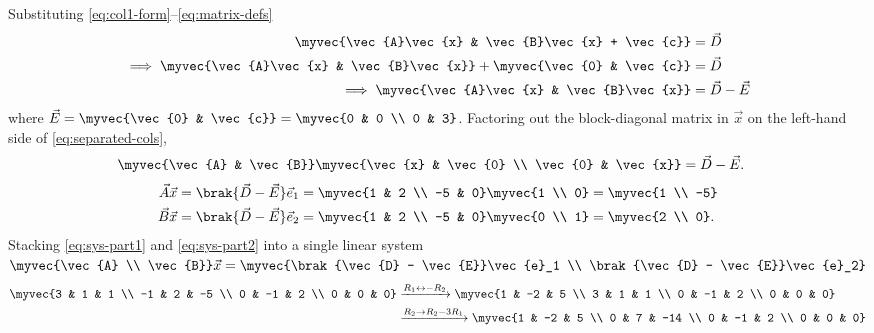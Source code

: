 \begin{enumerate}[label=\thesubsection.\arabic*, ref=\thesubsection.\theenumi]
	Substituting \eqref{eq:col1-form}--\eqref{eq:matrix-defs}
	\begin{align}
		\myvec{\vec{A}\vec{x} & \vec{B}\vec{x} + \vec{c}} &= \vec{D}
		\\
		\implies \myvec{\vec{A}\vec{x} & \vec{B}\vec{x}} + \myvec{\vec{0} & \vec{c}} &= \vec{D}
		\\
		\implies \myvec{\vec{A}\vec{x} & \vec{B}\vec{x}} &= \vec{D} - \vec{E}
		\label{eq:separated-cols}
	\end{align}
	where $\vec{E} = \myvec{\vec{0} & \vec{c}} = \myvec{0 & 0 \\ 0 & 3}$. Factoring out the block-diagonal matrix in $\vec{x}$ on the left-hand side of \eqref{eq:separated-cols},
	\begin{align}
		\myvec{\vec{A} & \vec{B}} \myvec{\vec{x} & \vec{0} \\ \vec{0} & \vec{x}} &= \vec{D} - \vec{E}.
		\label{eq:block-diagonal-form}
	\end{align}
	\begin{align}
		\vec{A}\vec{x} &= \brak{\vec{D} - \vec{E}}\vec{e}_1 = \myvec{1 & 2 \\ -5 & 0}\myvec{1 \\ 0} = \myvec{1 \\ -5}
		\label{eq:sys-part1}
		\\
		\vec{B}\vec{x} &= \brak{\vec{D} - \vec{E}}\vec{e}_2 = \myvec{1 & 2 \\ -5 & 0}\myvec{0 \\ 1} = \myvec{2 \\ 0}.
		\label{eq:sys-part2}
	\end{align}
	Stacking \eqref{eq:sys-part1} and \eqref{eq:sys-part2} into a single linear system $\myvec{\vec{A} \\ \vec{B}}\vec{x} = \myvec{\brak{\vec{D} - \vec{E}}\vec{e}_1 \\ \brak{\vec{D} - \vec{E}}\vec{e}_2}$ 
	\begin{align}
		\myvec{3 & 1 & 1 \\ -1 & 2 & -5 \\ 0 & -1 & 2 \\ 0 & 0 & 0}
		&\xrightarrow{R_1 \leftrightarrow -R_2}
		\myvec{1 & -2 & 5 \\ 3 & 1 & 1 \\ 0 & -1 & 2 \\ 0 & 0 & 0}
		\\
		&\xrightarrow{R_2 \to R_2 - 3R_1}
		\myvec{1 & -2 & 5 \\ 0 & 7 & -14 \\ 0 & -1 & 2 \\ 0 & 0 & 0}

\end{align}
\end{enumerate}
